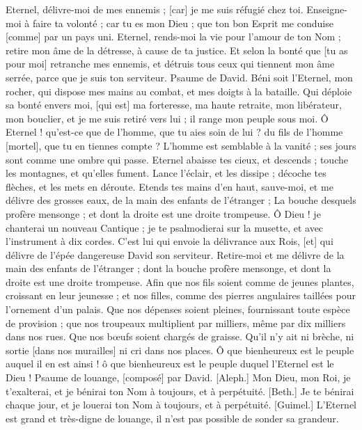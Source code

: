 \begin{multicols}{2}
Eternel, délivre-moi de mes ennemis ; [car] je me suis réfugié chez toi.
Enseigne-moi à faire ta volonté ; car tu es mon Dieu ; que ton bon Esprit me conduise [comme] par un pays uni.
Eternel, rends-moi la vie pour l'amour de ton Nom ; retire mon âme de la détresse, à cause de ta justice.
Et selon la bonté que [tu as pour moi] retranche mes ennemis, et détruis tous ceux qui tiennent mon âme serrée, parce que je suis ton serviteur.
\VerseOne{}Psaume de David. Béni soit l'Eternel, mon rocher, qui dispose mes mains au combat, et mes doigts à la bataille.
Qui déploie sa bonté envers moi, [qui est] ma forteresse, ma haute retraite, mon libérateur, mon bouclier, et je me suis retiré vers lui ; il range mon peuple sous moi.
Ô Eternel ! qu'est-ce que de l'homme, que tu aies soin de lui ? du fils de l'homme [mortel], que tu en tiennes compte ?
L'homme est semblable à la vanité ; ses jours sont comme une ombre qui passe.
Eternel abaisse tes cieux, et descends ; touche les montagnes, et qu'elles fument.
Lance l'éclair, et les dissipe ; décoche tes flèches, et les mets en déroute.
Etends tes mains d'en haut, sauve-moi, et me délivre des grosses eaux, de la main des enfants de l'étranger ;
La bouche desquels profère mensonge ; et dont la droite est une droite trompeuse.
Ô Dieu ! je chanterai un nouveau Cantique ; je te psalmodierai sur la musette, et avec l'instrument à dix cordes.
C'est lui qui envoie la délivrance aux Rois, [et] qui délivre de l'épée dangereuse David son serviteur.
Retire-moi et me délivre de la main des enfants de l'étranger ; dont la bouche profère mensonge, et dont la droite est une droite trompeuse.
Afin que nos fils soient comme de jeunes plantes, croissant en leur jeunesse ; et nos filles, comme des pierres angulaires taillées pour l'ornement d'un palais.
Que nos dépenses soient pleines, fournissant toute espèce de provision ; que nos troupeaux multiplient par milliers, même par dix milliers dans nos rues.
Que nos bœufs soient chargés de graisse. Qu'il n'y ait ni brèche, ni sortie [dans nos murailles] ni cri dans nos places.
Ô que bienheureux est le peuple auquel il en est ainsi ! ô que bienheureux est le peuple duquel l'Eternel est le Dieu !
\VerseOne{}Psaume de louange, [composé] par David. [Aleph.] Mon Dieu, mon Roi, je t'exalterai, et je bénirai ton Nom à toujours, et à perpétuité.
[Beth.] Je te bénirai chaque jour, et je louerai ton Nom à toujours, et à perpétuité.
[Guimel.] L'Eternel est grand et très-digne de louange, il n'est pas possible de sonder sa grandeur.

\end{multicols}
